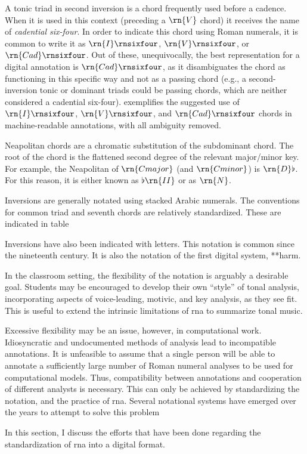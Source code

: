 A tonic triad in second inversion is a chord frequently used
before a cadence. When it is used in this context (preceding
a $\rn{V}$ chord) it receives the name of \emph{cadential
six-four}. In order to indicate this chord using Roman
numerals, it is common to write it as $\rn{I}\rnsixfour$,
$\rn{V}\rnsixfour$, or $\rn{Cad}\rnsixfour$. Out of these,
unequivocally, the best representation for a digital
annotation is $\rn{Cad}\rnsixfour$, as it disambiguates the
chord as functioning in this specific way and not as a
passing chord (e.g., a second-inversion tonic or dominant
triads could be passing chords, which are neither considered
a cadential six-four). 
exemplifies the suggested use of $\rn{I}\rnsixfour$,
$\rn{V}\rnsixfour$, and $\rn{Cad}\rnsixfour$ chords in
machine-readable annotations, with all ambiguity removed.

Neapolitan chords are a chromatic substitution of the
subdominant chord. The root of the chord is the flattened
second degree of the relevant major/minor key. For example,
the Neapolitan of $\rn{C major}$ (and $\rn{C minor}$) is
$\rn{D}\flat$. For this reason, it is either known as
$\flat\rn{II}$ or as $\rn{N}$.

Inversions are generally notated using stacked Arabic
numerals. The conventions for common triad and seventh
chords are relatively standardized. These are indicated in
table 



Inversions have also been indicated with letters. This
notation is common since the nineteenth century. It is also
the notation of the first digital system, **harm.

In the classroom setting, the flexibility of the notation is
arguably a desirable goal. Students may be encouraged to
develop their own ``style'' of tonal analysis, incorporating
aspects of voice-leading, motivic, and key analysis, as they
see fit. This is useful to extend the intrinsic limitations
of \gls{rna} to summarize tonal music.

Excessive flexibility may be an issue, however, in
computational work. Idiosyncratic and undocumented methods
of analysis lead to incompatible annotations. It is
unfeasible to assume that a single person will be able to
annotate a sufficiently large number of Roman numeral
analyses to be used for computational models. Thus,
compatibility between annotations and cooperation of
different analysts is necessary. This can only be achieved
by standardizing the notation, and the practice of
\gls{rna}. Several notational systems have emerged over the
years to attempt to solve this problem

In this section, I discuss the efforts that have been done
regarding the standardization of \gls{rna} into a digital
format.